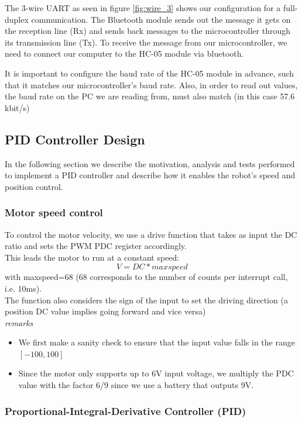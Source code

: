 The 3-wire UART as seen in figure \ref{fig:wire_3} shows our configuration for a full-duplex communication. The Bluetooth module sends out the message it gets on the reception line (Rx) and sends back messages to the microcontroller through its transmission line (Tx). To receive the message from our microcontroller, we need to connect our computer to the HC-05 module via bluetooth.

It is important to configure the baud rate of the HC-05 module in advance, such that it matches our microcontroller's baud rate. Also, in order to read out values, the baud rate on the PC we are reading from, must also match (in this case 57.6 kbit/s)


\subsection{PID Controller Design}

In the following section we describe the motivation, analysis and tests performed to implement a PID controller and describe how it enables the robot's speed and position control.

\subsubsection*{Motor speed control}
To control the motor velocity, we use a drive function that takes as input the DC ratio and sets the PWM PDC register accordingly. \\
\noindent
This leads the motor to run at a constant speed: $$V=DC*maxspeed$$ with maxspeed=68 (68 corresponds to the number of counts per interrupt call, i.e. 10ms). \\
\vskip 0.2in
\noindent
The function also considers the sign of the input to set the driving direction (a position DC value implies going forward and vice versa)\\
\vskip 0.2in
\noindent
\textit{remarks}
\begin{itemize}
    \item We first make a sanity check to ensure that the input value falls in the range $[-100, 100]$
    \item Since the motor only supports up to 6V input voltage, we multiply the PDC value with the factor 6/9 since we use a battery that outputs 9V.
\end{itemize}


\subsubsection{Proportional-Integral-Derivative Controller (PID)}

